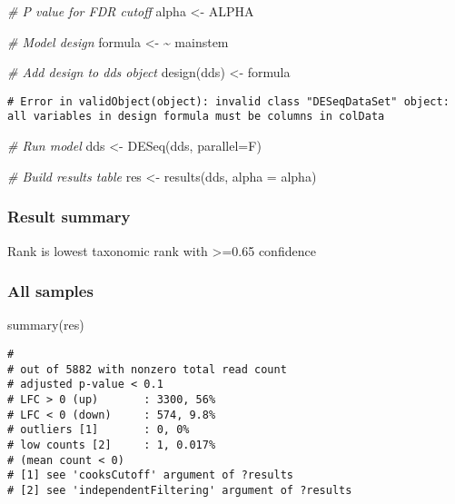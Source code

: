 \documentclass[
]{article}
\newenvironment{Shaded}{\begin{snugshade}}{\end{snugshade}}
\newcommand{\AttributeTok}[1]{\textcolor[rgb]{0.77,0.63,0.00}{#1}}
\newcommand{\CommentTok}[1]{\textcolor[rgb]{0.56,0.35,0.01}{\textit{#1}}}
\newcommand{\ErrorTok}[1]{\textcolor[rgb]{0.64,0.00,0.00}{\textbf{#1}}}
\newcommand{\FunctionTok}[1]{\textcolor[rgb]{0.00,0.00,0.00}{#1}}
\newcommand{\NormalTok}[1]{#1}
\newcommand{\OtherTok}[1]{\textcolor[rgb]{0.56,0.35,0.01}{#1}}
\begin{document}
\begin{Shaded}
\begin{Highlighting}[]
\CommentTok{\# P value for FDR cutoff}
\NormalTok{alpha }\OtherTok{\textless{}{-}}\NormalTok{ ALPHA}

\CommentTok{\# Model design}
\NormalTok{formula }\OtherTok{\textless{}{-}} \ErrorTok{\textasciitilde{}}\NormalTok{ mainstem}

\CommentTok{\# Add design to dds object}
\FunctionTok{design}\NormalTok{(dds) }\OtherTok{\textless{}{-}}\NormalTok{ formula}
\end{Highlighting}
\end{Shaded}

\begin{verbatim}
# Error in validObject(object): invalid class "DESeqDataSet" object: all variables in design formula must be columns in colData
\end{verbatim}

\begin{Shaded}
\begin{Highlighting}[]
\CommentTok{\# Run model}
\NormalTok{dds }\OtherTok{\textless{}{-}} \FunctionTok{DESeq}\NormalTok{(dds, }\AttributeTok{parallel=}\NormalTok{F)}

\CommentTok{\# Build results table}
\NormalTok{res }\OtherTok{\textless{}{-}} \FunctionTok{results}\NormalTok{(dds, }\AttributeTok{alpha =}\NormalTok{ alpha)}
\end{Highlighting}
\end{Shaded}

\hypertarget{result-summary-1}{%
\subsubsection{Result summary}\label{result-summary-1}}

Rank is lowest taxonomic rank with \textgreater=0.65 confidence

\hypertarget{all-samples-1}{%
\subsubsection{All samples}\label{all-samples-1}}

\begin{Shaded}
\begin{Highlighting}[]
\FunctionTok{summary}\NormalTok{(res)}
\end{Highlighting}
\end{Shaded}

\begin{verbatim}
# 
# out of 5882 with nonzero total read count
# adjusted p-value < 0.1
# LFC > 0 (up)       : 3300, 56%
# LFC < 0 (down)     : 574, 9.8%
# outliers [1]       : 0, 0%
# low counts [2]     : 1, 0.017%
# (mean count < 0)
# [1] see 'cooksCutoff' argument of ?results
# [2] see 'independentFiltering' argument of ?results
\end{verbatim}
\end{document}
